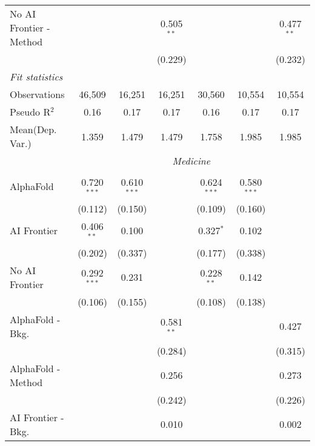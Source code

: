 \begin{tabular}{lcccccc}
   No AI Frontier - Method &               &               & 0.505$^{**}$  &               &              & 0.477$^{**}$\\   
                           &               &               & (0.229)       &               &              & (0.232)\\   
   \midrule
   \emph{Fit statistics}\\
   Observations            & 46,509        & 16,251        & 16,251        & 30,560        & 10,554       & 10,554\\  
   Pseudo R$^2$            & 0.16          & 0.17          & 0.17          & 0.16          & 0.17         & 0.17\\  
   
Mean(Dep. Var.) & 1.359 & 1.479 & 1.479 & 1.758 & 1.985 & 1.985 \\
 & \multicolumn{6}{c}{\textit{Medicine}} \\ \\
   AlphaFold               & 0.720$^{***}$ & 0.610$^{***}$ &              & 0.624$^{***}$ & 0.580$^{***}$ &   \\   
                           & (0.112)       & (0.150)       &              & (0.109)       & (0.160)       &   \\   
   AI Frontier             & 0.406$^{**}$  & 0.100         &              & 0.327$^{*}$   & 0.102         &   \\   
                           & (0.202)       & (0.337)       &              & (0.177)       & (0.338)       &   \\   
   No AI Frontier          & 0.292$^{***}$ & 0.231         &              & 0.228$^{**}$  & 0.142         &   \\   
                           & (0.106)       & (0.155)       &              & (0.108)       & (0.138)       &   \\   
   AlphaFold - Bkg.        &               &               & 0.581$^{**}$ &               &               & 0.427\\   
                           &               &               & (0.284)      &               &               & (0.315)\\   
   AlphaFold - Method      &               &               & 0.256        &               &               & 0.273\\   
                           &               &               & (0.242)      &               &               & (0.226)\\   
   AI Frontier - Bkg.      &               &               & 0.010        &               &               & 0.002\\   

\end{tabular}
